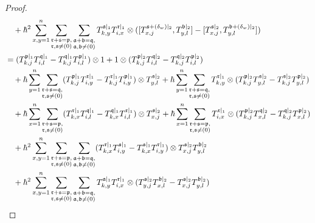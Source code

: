 \documentclass{article}
\theoremstyle{definition}
\theoremstyle{remark}
\numberwithin{equation}{section}
\numberwithin{equation}{section}
\begin{document}
\begin{proof}
\begin{align*}
&\quad+\hbar^2\sum_{x,y=1}^n\limits\sum_{\substack{\mathfrak{r}+\mathfrak{s}=\mathfrak{p},\\\mathfrak{r},\mathfrak{s}\neq(0)}}\sum_{\substack{\mathfrak{a}+\mathfrak{b}=\mathfrak{q},\\\mathfrak{a},\mathfrak{b}\neq(0)}}\limits T^{\mathfrak{a}|_1}_{k,y}T^{\mathfrak{r}|_1}_{i,x}\otimes ([T^{\mathfrak{s}+(\delta_w)|_2}_{x,j},T^{\mathfrak{b}|_2}_{y,l}]-[T^{\mathfrak{s}|_2}_{x,j},T^{\mathfrak{b}+(\delta_w)|_2}_{y,l}])\\
&=(T^{\mathfrak{p}|_1}_{k,j}T^{\mathfrak{q}|_1}_{i,l}-T^{\mathfrak{q}|_1}_{k,j}T^{\mathfrak{p}|_1}_{i,l})\otimes1+1\otimes (T^{\mathfrak{p}|_2}_{k,j}T^{\mathfrak{q}|_2}_{i,l}-T^{\mathfrak{q}|_2}_{k,j}T^{\mathfrak{p}|_2}_{i,l})\\
&\quad+\hbar\sum_{y=1}^n\limits\sum_{\substack{\mathfrak{r}+\mathfrak{s}=\mathfrak{q},\\\mathfrak{r},\mathfrak{s}\neq(0)}}(T^{\mathfrak{p}|_1}_{k,j}T^{\mathfrak{r}|_1}_{i,y}-T^{\mathfrak{r}|_1}_{k,j}T^{\mathfrak{p}|_1}_{i,y})\otimes T^{\mathfrak{s}|_2}_{y,l}+\hbar\sum_{y=1}^n\limits\sum_{\substack{\mathfrak{r}+\mathfrak{s}=\mathfrak{q},\\\mathfrak{r},\mathfrak{s}\neq(0)}}T^{\mathfrak{r}|_1}_{k,y}\otimes (T^{\mathfrak{p}|_2}_{k,j}T^{\mathfrak{s}|_2}_{y,l}-T^{\mathfrak{s}|_2}_{k,j}T^{\mathfrak{p}|_2}_{y,l})\\
&\quad+\hbar\sum_{x=1}^n\limits\sum_{\substack{\mathfrak{r}+\mathfrak{s}=\mathfrak{p},\\\mathfrak{r},\mathfrak{s}\neq(0)}}(T^{\mathfrak{r}|_1}_{k,x}T^{\mathfrak{q}|_1}_{i,l}-T^{\mathfrak{q}|_1}_{k,x}T^{\mathfrak{r}|_1}_{i,l})\otimes T^{\mathfrak{s}|_2}_{x,j}+\hbar\sum_{x=1}^n\limits\sum_{\substack{\mathfrak{r}+\mathfrak{s}=\mathfrak{p},\\\mathfrak{r},\mathfrak{s}\neq(0)}}T^{\mathfrak{r}|_1}_{i,x}\otimes (T^{\mathfrak{p}|_2}_{k,j}T^{\mathfrak{q}|_2}_{x,l}-T^{\mathfrak{q}|_2}_{k,j}T^{\mathfrak{p}|_2}_{x,l})\\
&\quad+\hbar^2\sum_{x,y=1}^n\limits\sum_{\substack{\mathfrak{r}+\mathfrak{s}=\mathfrak{p},\\\mathfrak{r},\mathfrak{s}\neq(0)}}\sum_{\substack{\mathfrak{a}+\mathfrak{b}=\mathfrak{q},\\\mathfrak{a},\mathfrak{b}\neq(0)}}\limits(T^{\mathfrak{r}|_1}_{k,x}T^{\mathfrak{s}|_1}_{i,y}-T^{\mathfrak{s}|_1}_{k,x}T^{\mathfrak{r}|_1}_{i,y})\otimes T^{\mathfrak{s}|_2}_{x,j}T^{\mathfrak{b}|_2}_{y,l}\\
&\quad+\hbar^2\sum_{x,y=1}^n\limits\sum_{\substack{\mathfrak{r}+\mathfrak{s}=\mathfrak{p},\\\mathfrak{r},\mathfrak{s}\neq(0)}}\sum_{\substack{\mathfrak{a}+\mathfrak{b}=\mathfrak{q},\\\mathfrak{a},\mathfrak{b}\neq(0)}}\limits T^{\mathfrak{a}|_1}_{k,y}T^{\mathfrak{r}|_1}_{i,x}\otimes (T^{\mathfrak{s}|_2}_{y,j}T^{\mathfrak{b}|_2}_{x,l}-T^{\mathfrak{s}|_2}_{x,j}T^{\mathfrak{b}|_2}_{y,l})\\

\end{align*}
\end{proof}
\end{document}
